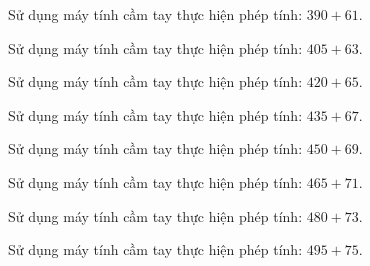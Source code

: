 \begin{ex}
  Sử dụng máy tính cầm tay thực hiện phép tính: $390 + 61$.
\end{ex}

\begin{ex}
  Sử dụng máy tính cầm tay thực hiện phép tính: $405 + 63$.
\end{ex}

\begin{ex}
  Sử dụng máy tính cầm tay thực hiện phép tính: $420 + 65$.
\end{ex}

\begin{ex}
  Sử dụng máy tính cầm tay thực hiện phép tính: $435 + 67$.
\end{ex}

\begin{ex}
  Sử dụng máy tính cầm tay thực hiện phép tính: $450 + 69$.
\end{ex}

\begin{ex}
  Sử dụng máy tính cầm tay thực hiện phép tính: $465 + 71$.
\end{ex}

\begin{ex}
  Sử dụng máy tính cầm tay thực hiện phép tính: $480 + 73$.
\end{ex}

\begin{ex}
  Sử dụng máy tính cầm tay thực hiện phép tính: $495 + 75$.
\end{ex}
